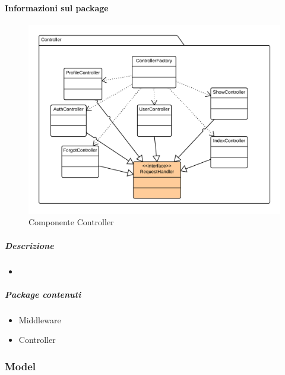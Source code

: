   \paragraph{Informazioni sul package} 
    \begin{figure}[H] 
      \begin{center} 
        \includegraphics[width=\textwidth]{uml/package/Back-end::Lib::Controller.png}  
        \caption{Componente Controller}
      \end{center}  
    \end{figure} 
  \subparagraph{Descrizione} 
    \begin{itemize}
    \item[] 
    \end{itemize} 
    \subparagraph{Package contenuti} 
    \begin{itemize}
        \item Middleware
        \item Controller
    \end{itemize}
  \subsubsection{Model}
